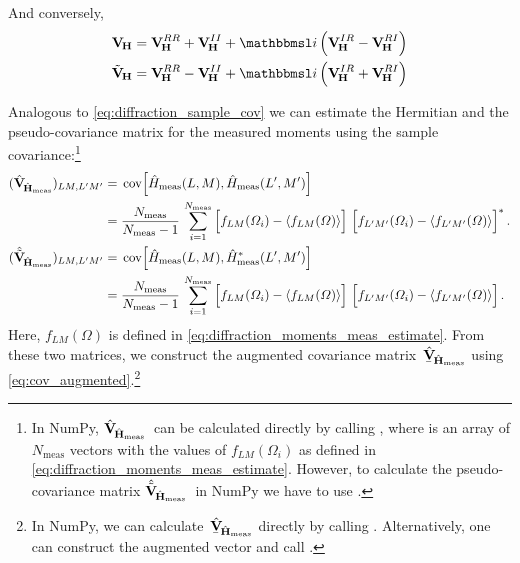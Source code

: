 And conversely,
\begin{align}
  \covMatSym_{\!\vect{H}}
  = \covMatSym_{\!\vect{H}}^{RR} + \covMatSym_{\!\vect{H}}^{II} + \imag \rBrk{\covMatSym_{\!\vect{H}}^{IR} - \covMatSym_{\!\vect{H}}^{RI}}
  \\
  \tilde{\covMatSym}_{\!\vect{H}}
  = \covMatSym_{\!\vect{H}}^{RR} - \covMatSym_{\!\vect{H}}^{II} + \imag \rBrk{\covMatSym_{\!\vect{H}}^{IR} + \covMatSym_{\!\vect{H}}^{RI}}
\end{align}

Analogous to \cref{eq:diffraction_sample_cov} we can estimate the
Hermitian and the pseudo-covariance matrix for the measured moments
using the sample covariance:\footnote{In NumPy,
$\hat{\bm{\mathrm{V}}}_{\!\hat{\bm{\mathrm{H}}}_\text{meas}}$~can be calculated
directly by calling , where
 is an array of $N_\text{meas}$ vectors with the values of
$f_{L M}(\Omega_i)$ as defined in
\cref{eq:diffraction_moments_meas_estimate}.  However, to calculate
the pseudo-covariance matrix
$\hat{\tilde{\bm{\mathrm{V}}}}_{\!\hat{\bm{\mathrm{H}}}_\text{meas}}$~in NumPy we
have to use .}
\begin{align}
  (\hat{\covMatSym}_{\!\hat{\vect{H}}_\text{meas}})_{L M, L' M'}
  ={}& \cov[2]{\hat{H}_\text{meas}(L, M), \hat{H}_\text{meas}(L', M')} \notag
  \\
  \label{eq:diffraction_sample_cov_hermit_meas}
  ={}& \frac{N_\text{meas}}{N_\text{meas} - 1}\, \sum_{i = 1}^{N_\text{meas}}
  \sBrk[2]{f_{L M}(\Omega_i) - \mean{f_{L M}(\Omega)}}\, \sBrk[2]{f_{L' M'}(\Omega_i) - \mean{f_{L' M'}(\Omega)}}^*.
  \\
  (\hat{\tilde{\covMatSym}}_{\!\hat{\vect{H}}_\text{meas}})_{L M, L' M'}
  ={}& \cov[2]{\hat{H}_\text{meas}(L, M), \hat{H}_\text{meas}^*(L', M')} \notag
  \\
  \label{eq:diffraction_sample_cov_pseudo_meas}
  ={}& \frac{N_\text{meas}}{N_\text{meas} - 1}\, \sum_{i = 1}^{N_\text{meas}}
  \sBrk[2]{f_{L M}(\Omega_i) - \mean{f_{L M}(\Omega)}}\, \sBrk[2]{f_{L' M'}(\Omega_i) - \mean{f_{L' M'}(\Omega)}}.
\end{align}
Here, $f_{L M}(\Omega)$ is defined in
\cref{eq:diffraction_moments_meas_estimate}.  From these two matrices,
we construct the augmented covariance
matrix~$\hat{\underaccent{\bar}{\covMatSym}}_{\!\hat{\vect{H}}_\text{meas}}$
using \cref{eq:cov_augmented}.\footnote{In NumPy, we can
calculate~$\hat{\underaccent{\bar}{\covMatSym}}_{\!\hat{\vect{H}}_\text{meas}}$
directly by calling .
Alternatively, one can construct the augmented vector  and call
.}

